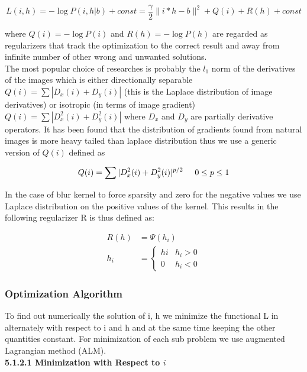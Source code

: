 \documentclass{article}
\begin{document}
\begin{equation}
    L(i, h) = -\log{P(i, h | b)} + const = \frac{\gamma}{2} \|i * h - b\|^2 + Q(i) + R(h) + const
\end{equation}

where $Q(i) = −\log{P(i)}$ and $R(h) = −\log{P(h)}$ are regarded as regularizers that track the optimization to the correct result and away from infinite number of other wrong and unwanted solutions. \\

The most popular choice of researches is probably the $l_1$ norm of the derivatives of the images which is either directionally separable $Q(i) = \sum |D_x(i) + D_y(i)|$ (this  is the Laplace distribution of image derivatives) or isotropic (in terms of image gradient) $Q(i) = \sum |D_x^2(i) + D_y^2(i)|$ where $D_x$ and $D_y$ are partially derivative operators. It has been found that the distribution of gradients found from natural images is more heavy tailed than laplace distribution thus we use a generic version of $Q(i)$ defined as

\begin{equation}
    Q(i) = \sum |D_x^2(i) + D_y^2(i)|^ {p/2} \hspace{.5cm} 0 \leq p \leq 1
\end{equation}

In the case of blur kernel to force sparsity and zero for the negative values we use Laplace distribution on the positive values of the kernel. This results in the following regularizer R is thus defined as: 

\begin{align}
    R(h) &= \Psi(h_i) \\
    h_i &= \begin{cases}
        hi & h_i > 0 \\
        0  & h_i < 0
    \end{cases}
\end{align}

\subsubsection{Optimization Algorithm}
To find out numerically the solution of i, h we minimize the functional L in alternately with respect to i and h and at the same time keeping the other quantities constant. For minimization of each sub problem we use  augmented Lagrangian method (ALM). \\

\textbf{5.1.2.1 Minimization with Respect to $i$} \\
\end{document}
